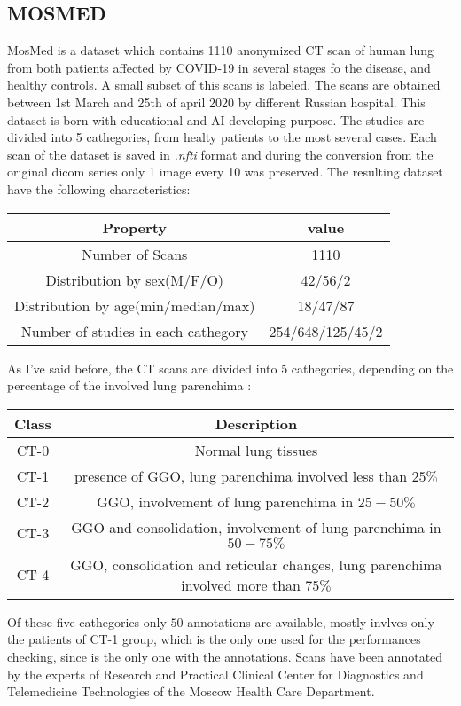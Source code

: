 \documentclass{standalone}
\begin{document}
	\subsection{MOSMED}
	
	MosMed is a dataset which contains 1110 anonymized CT scan of human lung from both patients affected by COVID-19 in several stages fo the disease, and healthy controls. A small subset of this scans is labeled. The scans are obtained between 1st March and 25th of april 2020 by different Russian hospital. This dataset is born with educational and AI developing purpose. The studies are divided into 5 cathegories, from healty patients to the most several cases. Each scan of the dataset is saved in \emph{.nfti} format and during the conversion from the original dicom series only 1 image every 10 was preserved.
	The resulting dataset have the following characteristics: 
	
	\begin{table}[h!]
		\centering
		\begin{tabular}{|c|c|}
			\hline
			\textbf{Property} 		   				   & \textbf{value}	  \\ \hline
			Number of Scans 		   				   & 1110             \\ 
			Distribution by sex(M/F/O) 				   & 42/56/2          \\
			Distribution by age(min/median/max)		   & 18/47/87         \\
			Number of studies in each cathegory		   & 254/648/125/45/2 \\ \hline
			
		\end{tabular}
	\end{table}

	As I've said before, the CT scans are divided into 5 cathegories, depending on the percentage of the involved lung parenchima : 
	\begin{table}[h!]
		\centering
		\begin{tabular}{|c|c|}
			\hline
			\textbf{Class} & \textbf{Description} \\ \hline
			CT-0		   & Normal  lung tissues \\
			CT-1		   & presence of GGO, lung parenchima involved less than $25\%$ \\
			CT-2		   & GGO, involvement of lung parenchima in $25 - 50\%$ \\
			CT-3		   & GGO and consolidation, involvement of lung parenchima in $50 - 75\%$ \\
			CT-4		   & GGO, consolidation and reticular changes, lung parenchima involved more than $75\%$\\ \hline
		\end{tabular}
	\end{table}

	Of these five cathegories only $50$ annotations are available, mostly invlves only the patients of CT-1 group, which is the only one used for the 
	performances checking, since is the only one with the annotations. Scans have been annotated by the experts of Research and Practical Clinical Center for Diagnostics and Telemedicine Technologies of the Moscow Health Care Department.
\end{document}
